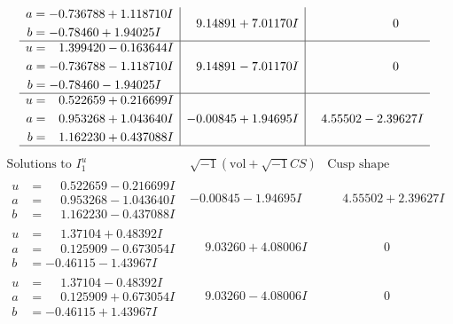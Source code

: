 \documentclass[1p]{elsarticle_modified}
\theoremstyle{definition}
\newcommand{\I}{\sqrt{-1}}
\begin{document}
$$\begin{array}{c|c|c}
\begin{aligned}
a &= -0.736788 + 1.118710 I \\
b &= -0.78460 + 1.94025 I\end{aligned}
 & \phantom{-}9.14891 + 7.01170 I & \phantom{-0.000000 } 0 \\ \hline\begin{aligned}
u &= \phantom{-}1.399420 - 0.163644 I \\
a &= -0.736788 - 1.118710 I \\
b &= -0.78460 - 1.94025 I\end{aligned}
 & \phantom{-}9.14891 - 7.01170 I & \phantom{-0.000000 } 0 \\ \hline\begin{aligned}
u &= \phantom{-}0.522659 + 0.216699 I \\
a &= \phantom{-}0.953268 + 1.043640 I \\
b &= \phantom{-}1.162230 + 0.437088 I\end{aligned}
 & -0.00845 + 1.94695 I & \phantom{-}4.55502 - 2.39627 I\\
 \hline 
 \end{array}$$\newpage$$\begin{array}{c|c|c}  
\text{Solutions to }I^u_{1}& \I (\text{vol} + \sqrt{-1}CS) & \text{Cusp shape}\\
 \hline 
\begin{aligned}
u &= \phantom{-}0.522659 - 0.216699 I \\
a &= \phantom{-}0.953268 - 1.043640 I \\
b &= \phantom{-}1.162230 - 0.437088 I\end{aligned}
 & -0.00845 - 1.94695 I & \phantom{-}4.55502 + 2.39627 I \\ \hline\begin{aligned}
u &= \phantom{-}1.37104 + 0.48392 I \\
a &= \phantom{-}0.125909 - 0.673054 I \\
b &= -0.46115 - 1.43967 I\end{aligned}
 & \phantom{-}9.03260 + 4.08006 I & \phantom{-0.000000 } 0 \\ \hline\begin{aligned}
u &= \phantom{-}1.37104 - 0.48392 I \\
a &= \phantom{-}0.125909 + 0.673054 I \\
b &= -0.46115 + 1.43967 I\end{aligned}
 & \phantom{-}9.03260 - 4.08006 I & \phantom{-0.000000 } 0 \\ \hline\begin{aligned}

\end{aligned}
\end{array}$$
\end{document}
